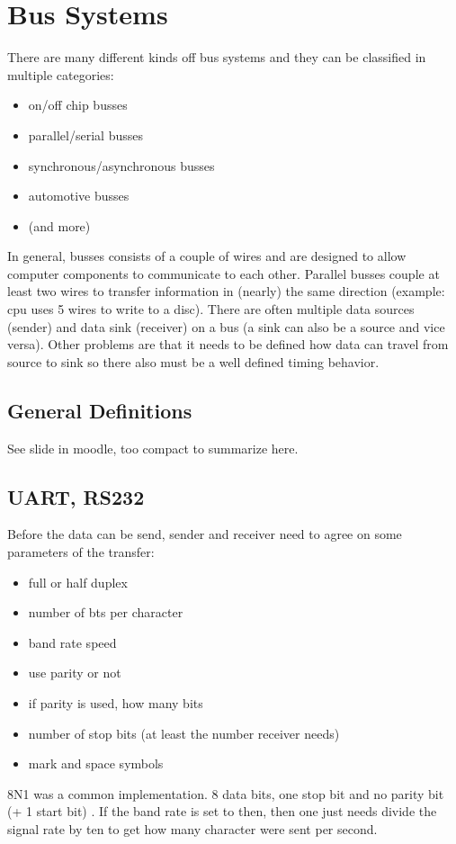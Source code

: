\documentclass[a4paper]{scrartcl}
\begin{document}
    \section{Bus Systems}
        There are many different kinds off bus systems and they can be classified in multiple categories:
        \begin{itemize}
            \item on/off chip busses
            \item parallel/serial busses
            \item synchronous/asynchronous busses 
            \item automotive busses
            \item (and more)
        \end{itemize}
        In general, busses consists of a couple of wires and are designed to allow computer components to communicate to each other. Parallel busses couple at least two 
        wires to transfer information in (nearly) the same direction (example: cpu uses 5 wires to write to a disc). There are often multiple data sources (sender)
        and data sink (receiver) on a bus (a sink can also be a source and vice versa). Other problems are that it needs to be defined how data can travel from source to 
        sink so there also must be a well defined timing behavior.
        \subsection{General Definitions}
            See slide in moodle, too compact to summarize here.
        \subsection{UART, RS232}
            Before the data can be send, sender and receiver need to agree on some parameters of the transfer:
            \begin{itemize}
                \item full or half duplex
                \item number of bts per character
                \item band rate speed 
                \item use parity or not
                \item if parity is used, how many bits
                \item number of stop bits (at least the number receiver needs)
                \item mark and space symbols %
            \end{itemize}
            8N1 was a common implementation. 8 data bits, one stop bit and no parity bit (+ 1 start bit)%
            . If the band rate is set to then, then one just needs 
            divide the signal rate by ten to get how many character were sent per second.  
\end{document}
